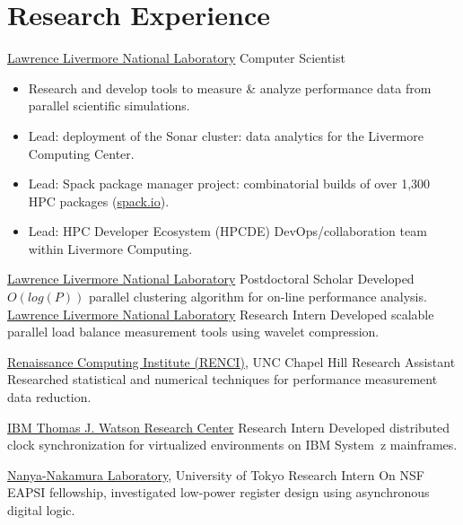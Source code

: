\section{Research Experience}
		{\href{http://www.llnl.gov}{Lawrence Livermore National Laboratory}}
		{Computer Scientist}
		{}{}
		{
		\begin{itemize}
		\item Research and develop tools to measure \& analyze
		 performance data from parallel scientific simulations.
		\item Lead: deployment of the Sonar cluster: data analytics for the Livermore Computing Center.
		\item Lead: Spack package manager project: combinatorial builds of over 1,300 HPC packages (\href{https://spack.io}{spack.io}).
		\item Lead: HPC Developer Ecosystem (HPCDE) DevOps/collaboration team within Livermore Computing.
		\end{itemize}
	}
		{\href{http://www.llnl.gov}{Lawrence Livermore National Laboratory}}
		{Postdoctoral Scholar}
		{}{}
		{Developed $O(log(P))$ parallel clustering algorithm for on-line performance analysis.
		 }
		{\href{http://www.llnl.gov}{Lawrence Livermore National Laboratory}}
		{Research Intern}
		{}{}
		{Developed scalable parallel load balance measurement tools using wavelet compression.}

		{\href{http://www.renci.org}{Renaissance Computing Institute (RENCI)}, UNC Chapel Hill}
		{Research Assistant}
		{}{}
		{Researched statistical and numerical techniques for performance measurement data reduction.}

		{\href{http://www.watson.ibm.com}{IBM Thomas J. Watson Research Center}}
		{Research Intern}
		{}{}
		{Developed distributed clock synchronization for virtualized environments on IBM System~z mainframes.}

		{\href{http://www.hal.rcast.u-tokyo.ac.jp/}{Nanya-Nakamura Laboratory}, University of Tokyo}
		{Research Intern}
		{}{}
		{On NSF EAPSI fellowship, investigated low-power register design using asynchronous digital logic.}

